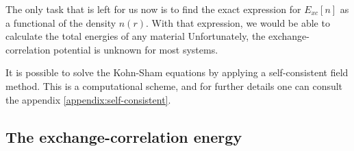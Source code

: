 The only task that is left for us now is to find the exact expression for $E_{xc}[n]$ as a functional of the density $n(r)$. With that expression, we would be able to calculate the total energies of any material%
Unfortunately, the exchange-correlation potential is unknown for most systems.

It is possible to solve the Kohn-Sham equations by applying a self-consistent field method. This is a computational scheme, and for further details one can consult the appendix \autoref{appendix:self-consistent}.




\subsection{The exchange-correlation energy}


